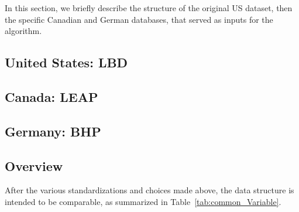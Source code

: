 
In this section, we briefly describe the structure of the original US dataset, then the specific Canadian and German databases, that served as inputs for the algorithm.

\subsection{United States: \acf{LBD}}



\subsection{Canada: \acf{LEAP}}



\subsection{Germany: \acf{BHP}}



\subsection{Overview}

After the various standardizations and choices made above, the data structure is intended to be comparable, as summarized in Table~\ref{tab:common_Variable}.

%

